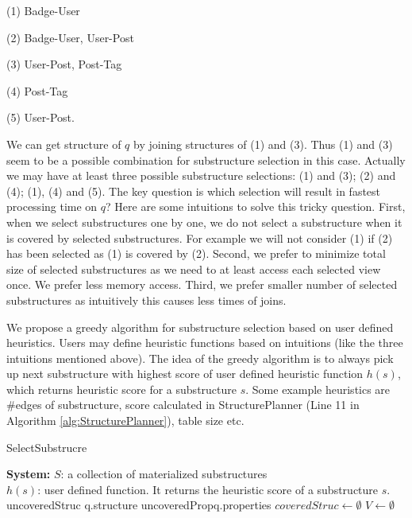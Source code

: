 (1) Badge-User

(2) Badge-User, User-Post

(3) User-Post, Post-Tag

(4) Post-Tag

(5) User-Post.

We can get structure of $q$ by joining structures of (1) and (3). Thus (1) and (3) seem to be a possible combination for substructure selection in this case. Actually we may have at least three possible substructure selections: (1) and (3); (2) and (4);
(1), (4) and (5). The key question is which selection will result in fastest processing time on $q$? Here are some intuitions to solve this tricky question. First, when we select substructures one by one, we do not select a substructure when it is covered by selected substructures. For example we will not consider (1) if (2) has been selected as (1) is covered by (2). Second, we prefer to minimize total size of selected substructures as we need to at least access each selected view once. We prefer less memory access. Third, we prefer smaller number of selected substructures as intuitively this causes less times of joins.

We propose a greedy algorithm for substructure selection based on user defined heuristics. Users may define heuristic functions based on intuitions (like the three intuitions mentioned above). The idea of the greedy algorithm is to always pick up next substructure with highest score of user defined heuristic function $h(s)$, which returns heuristic score for a substructure $s$. Some example heuristics are \#edges of substructure, score calculated in StructurePlanner (Line 11 in Algorithm \ref{alg:StructurePlanner}), table size etc.

\begin{algorithm}[H]
\caption{SelectSubstrucre}
\label{alg:SelectSubstrucre}
\LinesNumbered
\textbf{System:} $S$: a collection of materialized substructures\\ $h(s)$: user defined function. It returns the heuristic score of a substructure $s$.\\
uncoveredStruc \leftarrow q.structure\;
uncoveredProp\leftarrow q.properties\;
$coveredStruc\leftarrow \emptyset$\;
$V\leftarrow\emptyset $\;
\end{algorithm}

